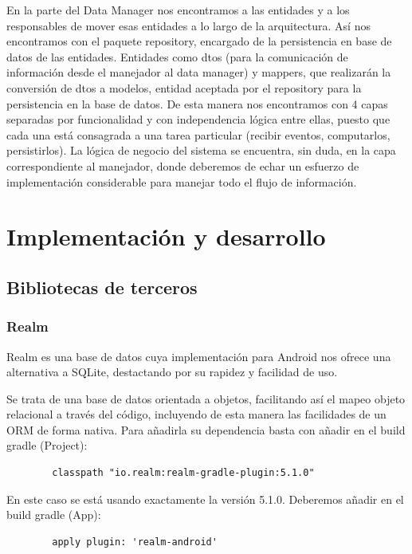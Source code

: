 \documentclass[12pt,a4paper,oneside]{book} %
\begin{document}
\newline \newline
En la parte del Data Manager nos encontramos a las entidades y a los responsables de mover esas entidades a lo largo de la arquitectura. 
\newline \newline
Así nos encontramos con el paquete repository, encargado de la persistencia en base de datos de las entidades. Entidades como dtos (para la comunicación de información desde el manejador al data manager) y mappers, que realizarán la conversión de dtos a modelos, entidad aceptada por el repository para la persistencia en la base de datos. 
\newline \newline
De esta manera nos encontramos con 4 capas separadas por funcionalidad y con independencia lógica entre ellas, puesto que cada una está consagrada a una tarea particular (recibir eventos, computarlos, persistirlos). 
\newline \newline
La lógica de negocio del sistema se encuentra, sin duda, en la capa correspondiente al manejador, donde deberemos de echar un esfuerzo de implementación considerable para manejar todo el flujo de información. 


\chapter{Implementación y desarrollo}
\section{Bibliotecas de terceros}
\subsection{Realm}
Realm es una base de datos cuya implementación para Android nos ofrece una alternativa a SQLite, destactando por su rapidez y facilidad de uso. 

Se trata de una base de datos orientada a objetos, facilitando así el mapeo objeto relacional a través del código, incluyendo de esta manera las facilidades de un ORM de forma nativa. 
\newline \newline
Para añadirla su dependencia basta con añadir en el build gradle (Project): 
\begin{verbatim}
		classpath "io.realm:realm-gradle-plugin:5.1.0"
\end{verbatim}
En este caso se está usando exactamente la versión 5.1.0. Deberemos añadir en el build gradle (App): 
\begin{verbatim}
		apply plugin: 'realm-android'

\end{verbatim}
\end{document}
